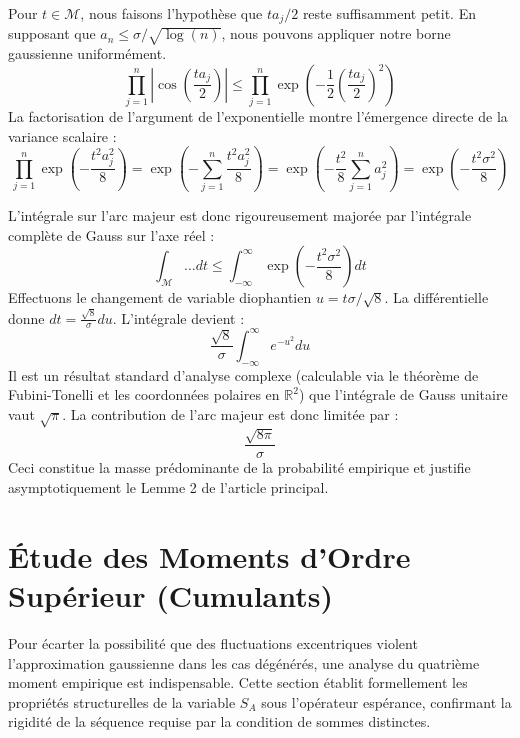\documentclass[12pt,a4paper]{article}
\begin{document}
Pour $t \in \mathcal{M}$, nous faisons l'hypothèse que $t a_j / 2$ reste suffisamment petit. En supposant que $a_n \le \sigma / \sqrt{\log(n)}$, nous pouvons appliquer notre borne gaussienne uniformément.
$$ \prod_{j=1}^n \left| \cos\left( \frac{t a_j}{2} \right) \right| \le \prod_{j=1}^n \exp\left( - \frac{1}{2} \left( \frac{t a_j}{2} \right)^2 \right) $$
La factorisation de l'argument de l'exponentielle montre l'émergence directe de la variance scalaire :
$$ \prod_{j=1}^n \exp\left( - \frac{t^2 a_j^2}{8} \right) = \exp\left( - \sum_{j=1}^n \frac{t^2 a_j^2}{8} \right) = \exp\left( - \frac{t^2}{8} \sum_{j=1}^n a_j^2 \right) = \exp\left( - \frac{t^2 \sigma^2}{8} \right) $$

L'intégrale sur l'arc majeur est donc rigoureusement majorée par l'intégrale complète de Gauss sur l'axe réel :
$$ \int_{\mathcal{M}} \dots dt \le \int_{-\infty}^{\infty} \exp\left( - \frac{t^2 \sigma^2}{8} \right) dt $$
Effectuons le changement de variable diophantien $u = t\sigma / \sqrt{8}$.
La différentielle donne $dt = \frac{\sqrt{8}}{\sigma} du$.
L'intégrale devient :
$$ \frac{\sqrt{8}}{\sigma} \int_{-\infty}^{\infty} e^{-u^2} du $$
Il est un résultat standard d'analyse complexe (calculable via le théorème de Fubini-Tonelli et les coordonnées polaires en $\mathbb{R}^2$) que l'intégrale de Gauss unitaire vaut $\sqrt{\pi}$.
La contribution de l'arc majeur est donc limitée par :
$$ \frac{\sqrt{8\pi}}{\sigma} $$
Ceci constitue la masse prédominante de la probabilité empirique et justifie asymptotiquement le Lemme 2 de l'article principal.

\newpage
\section{Étude des Moments d'Ordre Supérieur (Cumulants)}

Pour écarter la possibilité que des fluctuations excentriques violent l'approximation gaussienne dans les cas dégénérés, une analyse du quatrième moment empirique est indispensable. Cette section établit formellement les propriétés structurelles de la variable $S_A$ sous l'opérateur espérance, confirmant la rigidité de la séquence requise par la condition de sommes distinctes.
\end{document}
